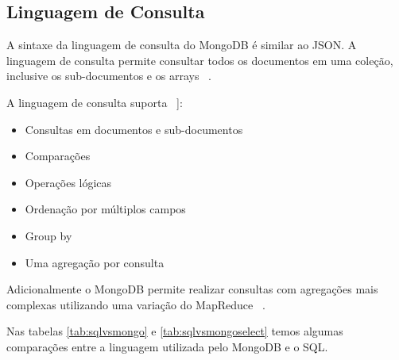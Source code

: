 \subsection{Linguagem de Consulta}

A sintaxe da linguagem de consulta do MongoDB é similar ao JSON. A linguagem de consulta permite consultar todos os documentos em uma coleção, inclusive os sub-documentos e os arrays ~\cite{Orendanalysisand}.

A linguagem de consulta suporta ~\cite{Orendanalysisand}]:
\begin{itemize}
	\item Consultas em documentos e sub-documentos
	\item Comparações
	\item Operações lógicas
	\item Ordenação por múltiplos campos
	\item Group by
	\item Uma agregação por consulta
\end{itemize}

Adicionalmente o MongoDB permite realizar consultas com agregações mais complexas utilizando uma variação do MapReduce ~\cite{Orendanalysisand}.

Nas tabelas \ref{tab:sqlvsmongo} e  \ref{tab:sqlvsmongoselect} temos algumas comparações entre a linguagem utilizada pelo MongoDB e o SQL.

